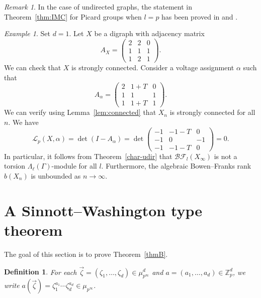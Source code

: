 \documentclass[11pt]{amsart}
\newtheorem{defn}[theorem]{Definition}
\numberwithin{equation}{section}
\theoremstyle{remark}
\newtheorem{remark}[theorem]{Remark}
\newtheorem{example}[theorem]{Example}
\newcommand{\?}{\stackrel{?}{=}}
\newcommand{\Zp}{\mathbb{Z}_p}
\newcommand{\BF}{\mathcal{BF}}
\begin{document}
\begin{remark}
   In the case of undirected graphs, the statement in Theorem~\ref{thm:IMC} for Picard groups when $l=p$ has been proved in \cite[Theorem 6.1]{kataoka} and \cite[Theorem 5.2 and Remark 5.3]{KM1}.  
\end{remark}
\begin{example}\label{eg:unbounded BF}
    Set $d=1$. Let $X$ be a digraph with adjacency matrix
    \[A_X=\begin{pmatrix}
        2&2&0\\
        1&1&1\\
        1&2&1
    \end{pmatrix}.\]
    We can check that $X$ is strongly connected. Consider a voltage assignment $\alpha$ such that 
    \[A_\alpha=\begin{pmatrix}
        2&1+T&0\\
        1&1&1\\
        1&1+T&1
    \end{pmatrix}.\]
    We can verify using Lemma~\ref{lem:connected} that $X_n$ is strongly connected for all $n$. We have
    \[\mathcal{L}_p(X,\alpha)=\det(I-A_\alpha)=\det\begin{pmatrix}
        -1&-1-T&0\\
        -1&0&-1\\
        -1&-1-T&0
    \end{pmatrix}=0.\]
In particular, it follows from Theorem~\ref{char-udir} that $\BF_l(X_\infty)$ is not a torsion $\Lambda_\ell(\Gamma)$-module for all $l$. Furthermore, the algebraic Bowen--Franks rank $b(X_n)$ is unbounded as $n\to\infty$.
\end{example}





\section{A Sinnott--Washington type theorem}
The goal of this section is to prove Theorem~\ref{thmB}.

\begin{defn}
For each $\vec\zeta=(\zeta_1,\dots,\zeta_d)\in\mu_{p^\infty}^d$ and $a=(a_1,\dots,a_d)\in\Zp^d$, we write $a(\vec\zeta)=\zeta_1^{a_{1}}\cdots \zeta_d^{a_{d}}\in\mu_{p^\infty}$.
\end{defn}
\end{document}
